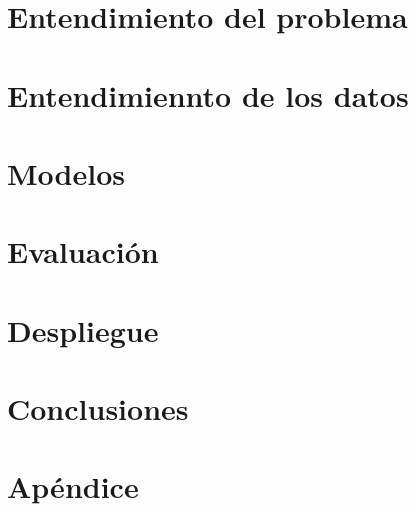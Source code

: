 \documentclass[openright,twoside,10pt]{book}
\begin{document}
\chapter{Entendimiento del problema}\label{cap.ent.problema}


\chapter{Entendimiennto de los datos}\label{cap.ent-datos}


\chapter{Modelos}\label{cap.modelos}


\chapter{Evaluación}\label{cap.test}


\chapter{Despliegue}\label{cap.despliegue}


%


\chapter{Conclusiones}\label{cap.conclusiones}



\chapter{Apéndice}\label{cap:apendice}






\cleardoublepage
{}

 


\end{document}
